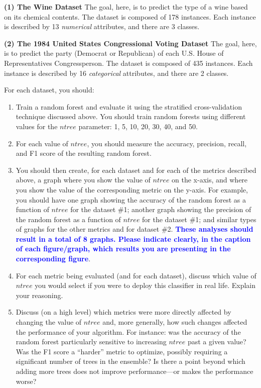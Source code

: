 \documentclass[letterpaper]{article}
\newcommand{\HIGHLIGHT}[1]{\textcolor{blue}{\textbf{#1}}}
\begin{document}
\textbf{(1) The Wine Dataset}
The goal, here, is to predict the type of a wine based on its chemical contents. The dataset is composed of 178 instances. Each instance is described by 13 \textit{numerical} attributes, and there are 3 classes.

\textbf{(2) The 1984 United States Congressional Voting Dataset}
The goal, here, is to predict the party (Democrat or Republican) of each U.S. House of Representatives Congressperson. The dataset is composed of 435 instances. Each instance is described by 16 \textit{categorical} attributes, and there are 2 classes.


For each dataset, you should:

\begin{enumerate}
    \item Train a random forest and evaluate it using the stratified cross-validation technique discussed above. You should train random forests using different values for the $ntree$ parameter: 1, 5, 10, 20, 30, 40, and 50.
    \item For each value of $ntree$, you should measure the accuracy, precision, recall, and F1 score of the resulting random forest. 
    \item You should then create, for each dataset and for each of the metrics described above, a graph where you show the value of $ntree$ on the x-axis, and where you show the value of the corresponding metric on the y-axis. For example, you should have one graph showing the accuracy of the random forest as a function of $ntree$ for the dataset \#1; another graph showing the precision of the random forest as a function of $ntree$ for the dataset \#1; and similar types of graphs for the other metrics and for dataset \#2. \HIGHLIGHT{These analyses should result in a total of 8 graphs. Please indicate clearly, in the caption of each figure/graph, which results you are presenting in the corresponding figure}.
    \item For each metric being evaluated (and for each dataset), discuss which value of $ntree$ you would select if you were to deploy this classifier in real life. Explain your reasoning. 
    \item Discuss (on a high level) which metrics were more directly affected by changing the value of $ntree$ and, more generally, how such changes affected the performance of your algorithm. For instance: was the accuracy of the random forest particularly sensitive to increasing $ntree$ past a given value? Was the F1 score a  ``harder'' metric to optimize, possibly requiring a significant number of trees in the ensemble? Is there a point beyond which adding more trees does not improve performance---or makes the performance worse?
\end{enumerate}
\end{document}
